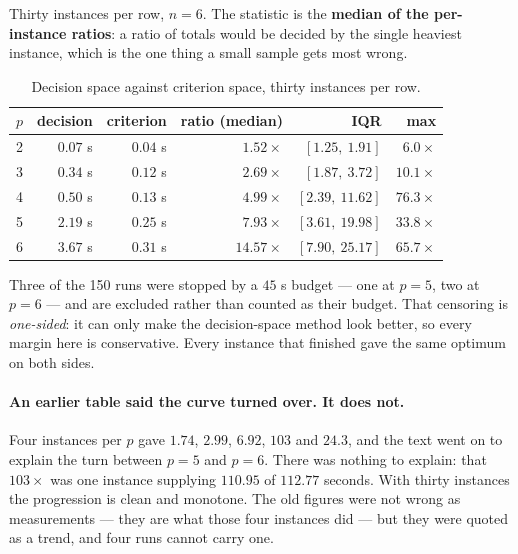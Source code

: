 \documentclass[11pt,a4paper]{article}
\begin{document}
Thirty instances per row, $n = 6$.  The statistic is the \textbf{median of the
per-instance ratios}: a ratio of totals would be decided by the single heaviest
instance, which is the one thing a small sample gets most wrong.

\begin{table}[h]
\centering
\caption{Decision space against criterion space, thirty instances per row.}
\label{tab:cmargin}
\begin{tabular}{crrrrr}
\toprule
$p$ & decision & criterion & ratio (median) & IQR & max \\
\midrule
2 & $0.07$ s & $0.04$ s & $1.52\times$  & $[1.25,\ 1.91]$   & $6.0\times$ \\
3 & $0.34$ s & $0.12$ s & $2.69\times$  & $[1.87,\ 3.72]$   & $10.1\times$ \\
4 & $0.50$ s & $0.13$ s & $4.99\times$  & $[2.39,\ 11.62]$  & $76.3\times$ \\
5 & $2.19$ s & $0.25$ s & $7.93\times$  & $[3.61,\ 19.98]$  & $33.8\times$ \\
6 & $3.67$ s & $0.31$ s & $14.57\times$ & $[7.90,\ 25.17]$  & $65.7\times$ \\
\bottomrule
\end{tabular}
\end{table}

\begin{center}
\end{center}

\noindent
Three of the 150 runs were stopped by a $45$ s budget --- one at $p=5$, two at
$p=6$ --- and are excluded rather than counted as their budget.  That censoring
is \emph{one-sided}: it can only make the decision-space method look better, so
every margin here is conservative.  Every instance that finished gave the same
optimum on both sides.

\paragraph{An earlier table said the curve turned over.  It does not.}  Four
instances per $p$ gave $1.74$, $2.99$, $6.92$, $103$ and $24.3$, and the text
went on to explain the turn between $p=5$ and $p=6$.  There was nothing to
explain: that $103\times$ was one instance supplying $110.95$ of $112.77$
seconds.  With thirty instances the progression is clean and monotone.  The old
figures were not wrong as measurements --- they are what those four instances
did --- but they were quoted as a trend, and four runs cannot carry one.
\end{document}
